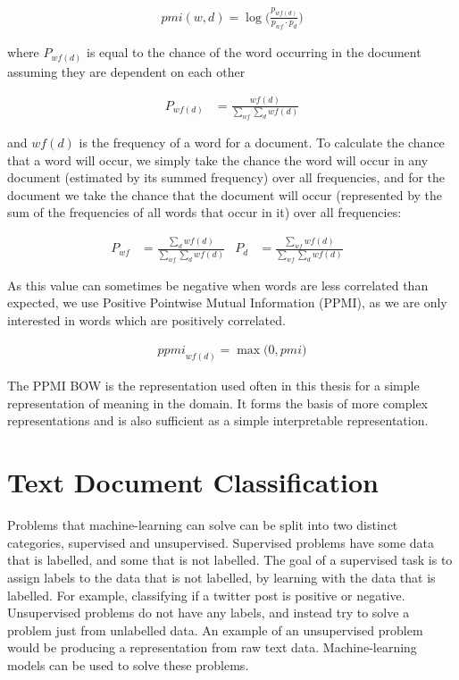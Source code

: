 \begin{align*}
\textit{pmi}(w, d) = \log\big(\frac{p_{{wf}(d)}}{p_{wf} \cdotp p_{d}}\big)
\end{align*}

where $P_{{wf}(d)}$ is equal to the chance of the word occurring in the document assuming they are dependent on each other 



\begin{align*}
P_{{wf}(d)} &= \frac{{wf}(d)}{\sum_{wf} \sum_{d} {wf}(d)}
\end{align*}

and ${wf}(d)$ is the frequency of a word for a document. To calculate the chance that a word will occur, we simply take the chance the word will occur in any document (estimated by its summed frequency) over all frequencies, and for the document we take the chance that the document  will occur (represented by the sum of the  frequencies of all words that occur in it) over all frequencies:

\begin{align*}
P_{wf} &= \frac{\sum_{d} {wf}(d)}{\sum_{wf} \sum_{d} {wf}(d)} &
P_{d} &= \frac{\sum_{wf} {wf}(d)}{\sum_{wf} \sum_{d} {wf}(d)} &
\end{align*}



As this value can sometimes be negative when words are less correlated than expected, we use Positive Pointwise Mutual Information (PPMI), as we are only interested in words which are positively correlated.

\begin{align*}
\textit{ppmi}_{{wf}(d)} = \max \big(0, pmi)
\end{align*}


The PPMI BOW is the representation used often in this thesis for a simple representation of meaning in the domain. It forms the basis of more complex representations and is also sufficient as a simple interpretable representation.

\section{Text Document Classification}\label{ch2:classifiers}

Problems that machine-learning can solve can be split into two distinct categories, supervised and unsupervised. Supervised problems have some data that is labelled, and some that is not labelled. The goal of a supervised task is to assign labels to the data that is not labelled, by learning with the data that is labelled. For example, classifying if a twitter post is positive or negative. Unsupervised problems do not have any labels, and instead try to solve a problem just from unlabelled data. An example of an unsupervised problem would be producing a representation from raw text data. Machine-learning models can be used to solve these problems.

